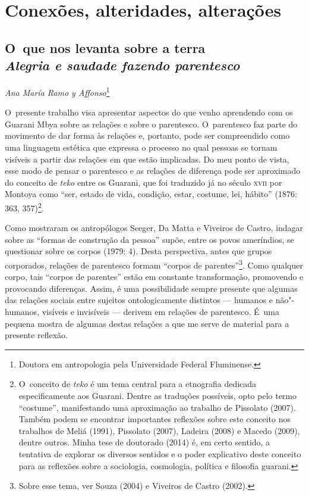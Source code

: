 \makeatletter\@openrightfalse
\movetooddpage
\part{Conexões, alteridades, alterações}
 


\chapter*{O~que nos levanta sobre a terra\\
\large{\emph{Alegria e saudade fazendo parentesco}}}


\@openrighttrue\makeatother
\begin{flushright}
\emph{Ana María Ramo y Affonso}\footnote{Doutora em antropologia pela
Universidade Federal Fluminense.}
\end{flushright}

\noindent
O~presente trabalho visa apresentar aspectos do que venho aprendendo com
os Guarani Mbya sobre as relações e sobre o parentesco. O~parentesco
faz parte do movimento de dar forma às relações e, portanto, pode ser
compreendido como uma linguagem estética que expressa o processo no
qual pessoas se tornam visíveis a partir das relações em que estão
implicadas. Do meu ponto de vista, esse modo de pensar o parentesco e
as relações de diferença pode ser aproximado do conceito de \emph{teko} entre
os Guarani, que foi traduzido já no século \textsc{xvii} por Montoya como ``ser,
estado de vida, condição, estar, costume, lei, hábito'' (1876: 363,
357)\footnote{O~conceito de \emph{teko} é um tema central para a etnografia
dedicada especificamente aos Guarani. Dentre as traduções possíveis,
opto pelo termo ``costume'', manifestando uma aproximação ao trabalho de
Pissolato (2007). Também podem se encontrar importantes reflexões sobre
este conceito nos trabalhos de Meliá (1991), Pissolato (2007), Ladeira
(2008) e Macedo (2009), dentre outros. Minha tese de doutorado (2014)
é, em certo sentido, a tentativa de explorar os diversos sentidos e o
poder explicativo deste conceito para as reflexões sobre a sociologia,
cosmologia, política e filosofia guarani.}.

Como mostraram os antropólogos Seeger, Da Matta e Viveiros de Castro,
indagar sobre as ``formas de construção da pessoa'' supõe, entre os povos
ameríndios, se questionar sobre os corpos (1979: 4). Desta perspectiva,
antes que grupos corporados, relações de parentesco formam ``corpos de
parentes''\footnote{Sobre
esse tema, ver Souza (2004) e Viveiros de Castro (2002).}. Como
qualquer corpo, tais ``corpos de parentes'' estão em constante
transformação, promovendo e provocando diferenças. Assim, é uma
possibilidade sempre presente que algumas das relações sociais entre
sujeitos ontologicamente distintos --- humanos e não"-humanos, visíveis e
invisíveis --- derivem em relações de parentesco. É~uma pequena mostra de
algumas destas relações a que me serve de material para a presente
reflexão.

